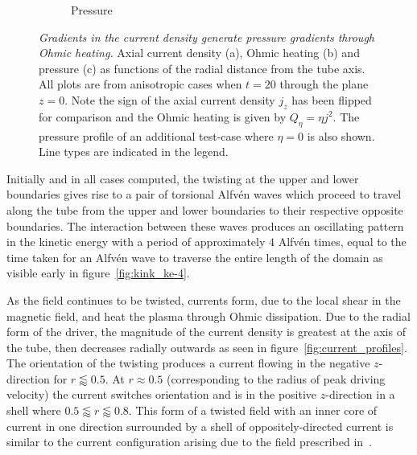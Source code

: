 \documentclass[fleqn,usenatbib]{mnras}
\newcommand{\rs}[2]{{#2}}
\newcommand{\mycaption}[2]{\caption[#1]{\emph{#1} #2}}
\begin{document}
\begin{figure}
\begin{subfigure}{0.32\textwidth}
      \caption{Pressure}
      \label{fig:pressure_profiles}
    \end{subfigure}
  \mycaption{Gradients in the current density generate pressure
    gradients through Ohmic heating.}{\rs{}{Axial current density (a), Ohmic heating
      (b) and pressure (c) as functions of the radial distance from
      the tube axis.}{} All plots are from \rs{switching}{anisotropic}
    cases when $t=20$ through the plane $z=0$. Note the sign of the
    axial current density $j_z$ has been flipped for comparison and
    the Ohmic heating is given by $Q_{\eta} = \eta j^2$. The pressure
    profile of an additional test-case where $\eta=0$ is also
    shown. \rs{}{Line types are indicated in the legend.}}%
  \label{fig:pressure_and_heating}
\end{figure}

\rs{In all cases, the initial reaction to the twisting at the upper
and lower boundaries is two}{Initially and in all cases computed, the
twisting at the upper and lower boundaries gives rise to a pair of}
torsional Alfv\'en waves which \rs{}{proceed to} travel along the tube
from the upper and lower boundaries to \rs{the}{their respective}
opposite boundaries. The interaction between these waves produces an 
oscillating pattern in the kinetic energy with a period of
approximately $4$ Alfv\'en times, equal to the time taken for an
Alfv\'en wave to \rs{travel}{traverse} the entire length of the domain
\rs{}{as} visible early in figure~\ref{fig:kink_ke-4}. 

As the field continues to be twisted, currents form, due to the local
shear in the magnetic field, \rs{which}{and} heat the plasma through Ohmic
\rs{heating}{dissipation}. Due to the radial form of the driver, the magnitude of the
current density is greatest at the axis of the tube, then decreases
radially outwards \rs{}{as seen in} figure~\ref{fig:current_profiles}. The orientation
of the twisting produces a current \rs{directed}{flowing} in the negative
$z$-direction for $r\lessapprox0.5$. At $r \approx 0.5$ (corresponding
to the radius of peak driving velocity) the current switches \rs{direction}{orientation}
and is in the positive $z$-direction in a shell where $0.5\lessapprox
r \lessapprox 0.8$. This form of \rs{}{a} twisted field with an inner core of
current in one direction surrounded by \rs{an}{a shell of}
oppositely-directed current is similar to the current configuration arising due to the field prescribed in~\citet{quinnEffectAnisotropicViscosity2020}. 
\end{document}
